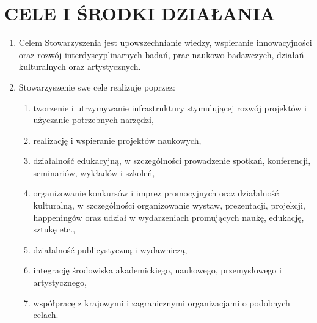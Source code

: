 \documentclass{article}
\begin{document}
\section{CELE I ŚRODKI DZIAŁANIA}
  \begin{enumerate}
    \item Celem Stowarzyszenia jest upowszechnianie wiedzy, wspieranie innowacyjności oraz rozwój interdyscyplinarnych badań, prac naukowo-badawczych, działań kulturalnych oraz artystycznych.
    \item Stowarzyszenie swe cele realizuje poprzez:
      \begin{enumerate}
        \item tworzenie i utrzymywanie infrastruktury stymulującej rozwój projektów i użyczanie potrzebnych narzędzi,
        \item realizację i wspieranie projektów naukowych,
        \item działalność edukacyjną, w szczególności prowadzenie spotkań, konferencji, seminariów, wykładów i szkoleń,
        \item organizowanie konkursów i imprez promocyjnych oraz działalność kulturalną, w szczególności organizowanie wystaw, prezentacji, projekcji, happeningów oraz udział w wydarzeniach promujących naukę, edukację, sztukę etc.,
        \item działalność publicystyczną i wydawniczą,
        \item integrację środowiska akademickiego, naukowego, przemysłowego i artystycznego,
        \item współpracę z krajowymi i zagranicznymi organizacjami o podobnych celach.
      \end{enumerate}
  \end{enumerate}
\end{document}
